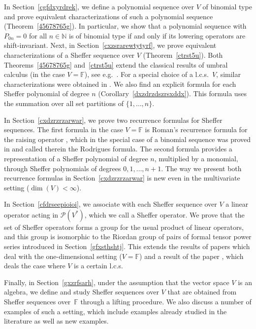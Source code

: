 \documentclass[12pt]{article}
\theoremstyle{remark}
\theoremstyle{remark}
\theoremstyle{remark}
\begin{document}
In Section~\ref{cgfdxyrdrek}, we define a polynomial sequence over $V$ of binomial type and prove equivalent characterizations of such a polynomial sequence  (Theorem~\ref{45678765g}). In particular, we show that a polynomial sequence with $P_{0n}=0$ for all $n\in\mathbb N$ 
is of binomial type if and only if its lowering operators are shift-invariant.  Next, in Section~\ref{cxzsrarewtytyrf}, we prove equivalent characterizations of a Sheffer sequence  over $V$ (Theorem~\ref{ctrst5u}). Both Theorems~\ref{45678765g} and~\ref{ctrst5u} extend the classical results of umbral calculus (in the case $V=\mathbb F$), see e.g.\ \cite[Sections~4.3 and~4.4]{KRY}.  For a special choice of a l.c.s.\ $V$, similar characterizations were obtained in \cite{FKLO}. 
We also find an explicit formula for each Sheffer polynomial of degree $n$ (Corollary~\ref{dxzdrzdszrsxddx}). This formula uses the summation over all set partitions of $\{1,\dots,n\}$.  

In Section~\ref{cxdzrzrzarwar}, we prove two recurrence formulas for Sheffer sequences. The first formula in the case $V=\mathbb F$ is  Roman's recurrence formula for the raising operator \cite[Theorem~3.7.1]{Roman}, which in the special case of a binomial sequence was proved in  \cite[Section~4, Theorem~4~(4)]{RotaKahanerOdlyzko} and called therein the Rodrigues formula. The second formula provides a representation of a Sheffer polynomial of degree $n$, multiplied by a monomial, through Sheffer polynomials of degrees $0,1,\dots,n+1$.  The way we present both recurrence formulas in Section~\ref{cxdzrzrzarwar} is new even in the multivariate setting ($\operatorname{dim}(V)<\infty$). 

In Section~\ref{cfdrseepioioi}, we associate with each Sheffer sequence over $V$ a linear operator acting in $\mathcal P(V^*)$, which we call a Sheffer operator. We prove that the set of Sheffer operators forms a group for the usual product of linear operators, and this group is isomorphic to the Riordan group of pairs of formal tensor power series introduced in Section~\ref{gfxsthshtj}. This extends the results of papers  \cite{HeHsuShiue,WangZhang} which deal with the one-dimensional setting ($V=\mathbb F$) and a result of the paper \cite{FLO}, which deals the case where $V$ is a certain l.c.s.

Finally, in Section~\ref{gxzrfsarh}, under the assumption that the vector space $V$ is an algebra, we define and study Sheffer sequences over $V$ that are obtained from Sheffer sequences over~$\mathbb F$ through a lifting procedure. We also discuss a number of examples of such a setting, which include examples  already studied  in the literature as well as new examples.  
\end{document}
